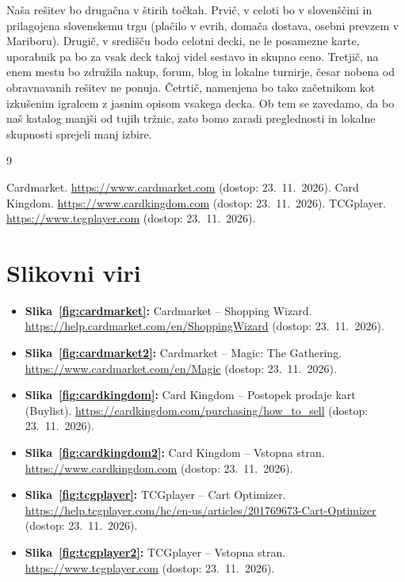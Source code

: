 \documentclass[11pt,a4paper]{article}
\begin{document}
Naša rešitev bo drugačna v štirih točkah. Prvič, v celoti bo v slovenščini in prilagojena slovenskemu trgu (plačilo v evrih, domača dostava, osebni prevzem v Mariboru). Drugič, v središču bodo celotni decki, ne le posamezne karte, uporabnik pa bo za vsak deck takoj videl sestavo in skupno ceno. Tretjič, na enem mestu bo združila nakup, forum, blog in lokalne turnirje, česar nobena od obravnavanih rešitev ne ponuja. Četrtič, namenjena bo tako začetnikom kot izkušenim igralcem z jasnim opisom vsakega decka. Ob tem se zavedamo, da bo naš katalog manjši od tujih tržnic, zato bomo zaradi preglednosti in lokalne skupnosti sprejeli manj izbire.

\begin{thebibliography}{9}\small

 Cardmarket. \url{https://www.cardmarket.com} (dostop: 23.~11.~2026).
 Card Kingdom. \url{https://www.cardkingdom.com} (dostop: 23.~11.~2026).
 TCGplayer. \url{https://www.tcgplayer.com} (dostop: 23.~11.~2026).

\end{thebibliography}

\section*{Slikovni viri}
\begin{itemize}\small
  \item \textbf{Slika~\ref{fig:cardmarket}:} Cardmarket -- Shopping Wizard. \url{https://help.cardmarket.com/en/ShoppingWizard} (dostop: 23.~11.~2026).
  \item \textbf{Slika~\ref{fig:cardmarket2}:} Cardmarket -- Magic: The Gathering. \url{https://www.cardmarket.com/en/Magic} (dostop: 23.~11.~2026).
  \item \textbf{Slika~\ref{fig:cardkingdom}:} Card Kingdom -- Postopek prodaje kart (Buylist). \url{https://cardkingdom.com/purchasing/how_to_sell} (dostop: 23.~11.~2026).
  \item \textbf{Slika~\ref{fig:cardkingdom2}:} Card Kingdom -- Vstopna stran. \url{https://www.cardkingdom.com} (dostop: 23.~11.~2026).
  \item \textbf{Slika~\ref{fig:tcgplayer}:} TCGplayer -- Cart Optimizer. \url{https://help.tcgplayer.com/hc/en-us/articles/201769673-Cart-Optimizer} (dostop: 23.~11.~2026).
  \item \textbf{Slika~\ref{fig:tcgplayer2}:} TCGplayer -- Vstopna stran. \url{https://www.tcgplayer.com} (dostop: 23.~11.~2026).
\end{itemize}
\end{document}
